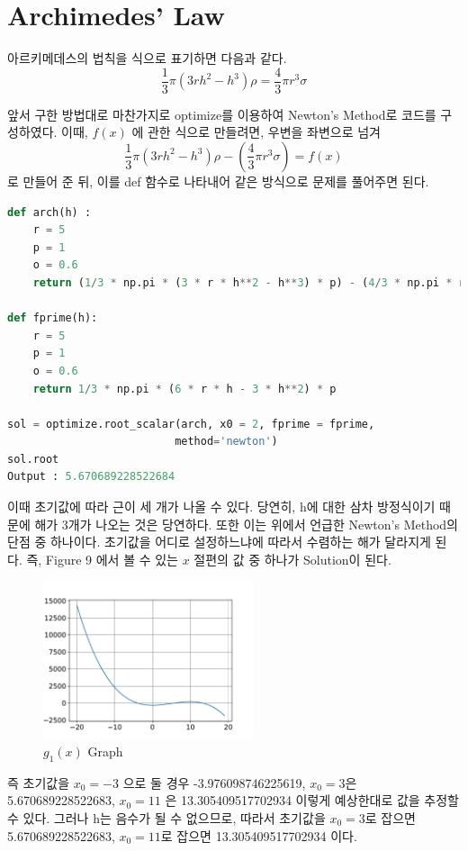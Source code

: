 \documentclass[11pt]{article}
\begin{document}
\section{Archimedes’ Law}
아르키메데스의 법칙을 식으로 표기하면 다음과 같다.
$$
\frac{1}{3}\pi (3rh^2 - h^3) \rho = \frac{4}{3}\pi r^3\sigma
$$

\noindent  
앞서 구한 방법대로 마찬가지로  optimize를 이용하여 Newton's Method로 코드를 구성하였다. 이때, $f(x)$ 에 관한 식으로 만들려면,  우변을 좌변으로 넘겨
$$
\frac{1}{3}\pi (3rh^2 - h^3) \rho - ( \frac{4}{3}\pi r^3\sigma ) = f(x) 
$$
로 만들어 준 뒤, 이를 def 함수로 나타내어 같은 방식으로 문제를 풀어주면 된다. 
\begin{lstlisting}[language=Python]
def arch(h) :
    r = 5
    p = 1
    o = 0.6
    return (1/3 * np.pi * (3 * r * h**2 - h**3) * p) - (4/3 * np.pi * r**3 * o)

def fprime(h):
    r = 5
    p = 1
    o = 0.6
    return 1/3 * np.pi * (6 * r * h - 3 * h**2) * p

sol = optimize.root_scalar(arch, x0 = 2, fprime = fprime, 
                          method='newton')
sol.root
Output : 5.670689228522684
\end{lstlisting}

이때 초기값에 따라 근이 세 개가 나올 수 있다. 당연히, h에 대한 삼차 방정식이기 때문에 해가 3개가 나오는 것은 당연하다. 또한 이는 위에서 언급한 Newton's Method의 단점 중 하나이다. 초기값을 어디로 설정하느냐에 따라서 수렴하는 해가 달라지게 된다. 즉, Figure 9 에서 볼 수 있는 $x$ 절편의 값 중 하나가 Solution이 된다.

\begin{figure}[!ht]
  \centering
  \includegraphics[width=0.55\textwidth]{Newton_Method3.pdf}
  \caption{$g_1(x)$ Graph}
\end{figure}

즉 초기값을 $x_0 = -3$ 으로 둘 경우 -3.976098746225619, $x_0 = 3$은 5.670689228522683, $x_0 = 11$ 은 13.305409517702934 이렇게 예상한대로 값을 추정할 수 있다. 그러나 h는 음수가 될 수 없으므로, 따라서 초기값을 $x_0 = 3$로 잡으면 5.670689228522683, $x_0 = 11$로 잡으면 13.305409517702934 이다.
\clearpage
\end{document}
